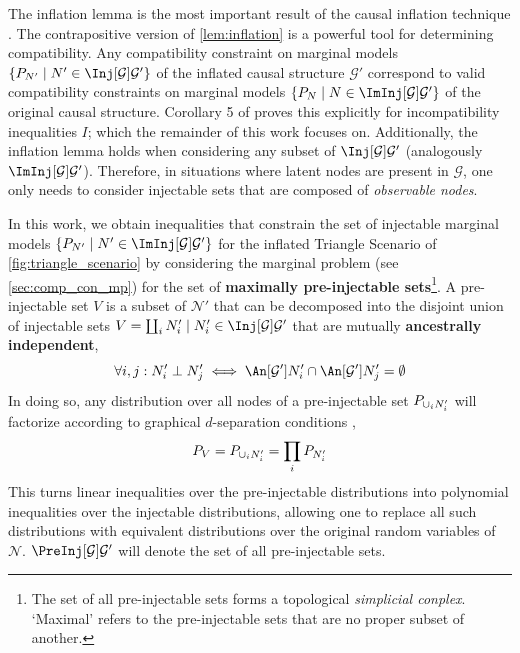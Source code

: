 \documentclass[aps, 10pt, english, twoside, pra, nofootinbib, longbibliography]{revtex4-1}
\theoremstyle{plain}
\theoremstyle{definition}
\theoremstyle{remark}
\newcommand{\graph}{\mathcal{G}}
\newcommand{\nodes}{\mathcal{N}}
\newcommand{\ancestralindep}{\perp}
\newcommand{\term}[1]{\textcolor{Mahogany}{\textbf{#1}}}
\begin{document}
    The inflation lemma is the most important result of the causal inflation technique \cite{Inflation}. The contrapositive version of \cref{lem:inflation} is a powerful tool for determining compatibility. Any compatibility constraint on marginal models $\bc{\prob[N'] \mid N' \in \Inj[\graph]{\graph'}}$ of the inflated causal structure $\graph'$ correspond to valid compatibility constraints on marginal models $\bc{\prob[N] \mid N \in \ImInj[\graph]{\graph'}}$ of the original causal structure. Corollary 5 of \cite{Inflation} proves this explicitly for incompatibility inequalities $I$; which the remainder of this work focuses on.  Additionally, the inflation lemma holds when considering any subset of $\Inj[\graph]{\graph'}$ (analogously $\ImInj[\graph]{\graph'}$). Therefore, in situations where latent nodes are present in $\graph$, one only needs to consider injectable sets that are composed of \textit{observable nodes}.

    In this work, we obtain inequalities that constrain the set of injectable marginal models $\bc{\prob[N'] \mid N' \in \ImInj[\graph]{\graph'}}$ for the inflated Triangle Scenario of \cref{fig:triangle_scenario} by considering the marginal problem (see \cref{sec:comp_con_mp}) for the set of \term{maximally pre-injectable sets}\footnote{The set of all pre-injectable sets forms a topological \textit{simplicial conplex}. `Maximal' refers to the pre-injectable sets that are no proper subset of another.}. A pre-injectable set $V$ is a subset of $\nodes'$ that can be decomposed into the disjoint union of injectable sets $V = \coprod_i N'_i \mid N'_i \in \Inj[\graph]{\graph'}$ that are mutually \term{ancestrally independent},
    \[ \forall i,j : N'_i \ancestralindep N'_j \iff \An[\graph']{N'_i} \cap \An[\graph']{N'_j} = \emptyset  \]
    In doing so, any distribution over all nodes of a pre-injectable set $\prob[\cup_i N'_i]$ will factorize according to graphical $d$-separation conditions \cite{Pearl_2009},
    \[ \prob[V] = \prob[\cup_i N'_i] = \prod_{i}\prob[N'_i] \]
    This turns linear inequalities over the pre-injectable distributions into polynomial inequalities over the injectable distributions, allowing one to replace all such distributions with equivalent distributions over the original random variables of $\nodes$. $\PreInj[\graph]{\graph'}$ will denote the set of all pre-injectable sets.
\end{document}
